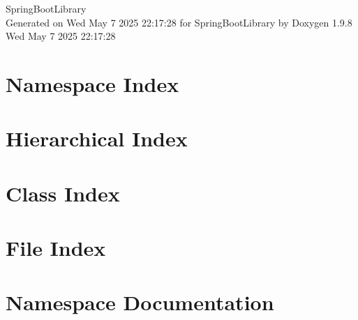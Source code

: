 \documentclass[twoside]{book}
\newcommand{\+}{\discretionary{\mbox{\scriptsize$\hookleftarrow$}}{}{}}
\newcommand{\clearemptydoublepage}{%
    \newpage{\pagestyle{empty}\cleardoublepage}%
  }
\begin{document}
  \raggedbottom
    \hypersetup{pageanchor=false,
                bookmarksnumbered=true,
                pdfencoding=unicode
               }
  \begin{titlepage}
  \vspace*{7cm}
  \begin{center}%
  {\Large Spring\+Boot\+Library}\\
  \vspace*{1cm}
  {\large Generated on Wed May 7 2025 22\+:17\+:28 for Spring\+Boot\+Library by Doxygen 1.9.8}\\
    \vspace*{0.5cm}
    {\small Wed May 7 2025 22:17:28}
  \end{center}
  \end{titlepage}
  \clearemptydoublepage
  \tableofcontents
  \clearemptydoublepage
  \hypersetup{pageanchor=true}
\chapter{Namespace Index}

\chapter{Hierarchical Index}

\chapter{Class Index}

\chapter{File Index}

\chapter{Namespace Documentation}








\end{document}
